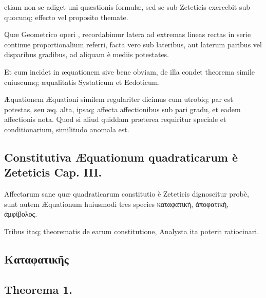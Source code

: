 \documentclass[11pt,a4paper]{article}
\begin{document}
 etiam non se adiget uni quæstionis formulæ, sed se sub Zeteticis exercebit sub quocunq; effecto vel proposito themate.

Quæ Geometrico operi , recordabimur latera ad extremas lineas rectas in serie continue proportionalium referri, facta vero sub lateribus, aut laterum paribus vel disparibus gradibus, ad aliquam è mediis potestates.

Et cum incidet in æquationem  sive bene obviam, de illa condet theorema simile \struck{\ill{}} cuiuscumq; æqualitatis Systaticum et Ecdoticum.

Æquationem Æquationi similem regulariter dicimus cum utrobiq; par est potestas, seu æq. alta, ipsaq; affecta affectionibus sub pari gradu, et eadem affectionis nota. Quod si aliud quiddam præterea requiritur speciale et conditionarium, similitudo anomala est.

\subsection*{Constitutiva Æquationum quadraticarum è Zeteticis Cap. III.}

Affectarum sane quæ  quadraticarum constitutio è Zeteticis dignoscitur probè, sunt autem Æquationum huiusmodi tres species καταφατική, ἀποφατική, ἀμφίβολος.

Tribus itaq; theorematis de earum constitutione, Analysta ita poterit ratiocinari.


\subsection*{Καταφατικῆς}

\subsection*{Theorema 1.}
\end{document}
